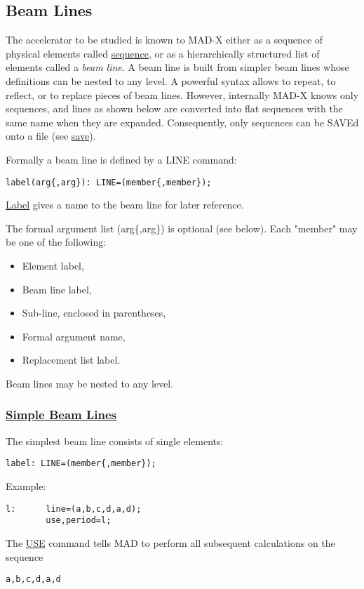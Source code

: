 

\subsection{Beam Lines}

The accelerator to be studied is known to MAD-X either as a sequence of
physical elements called \href{sequence.html}{sequence}, or as a
hierarchically structured list of elements called a \emph{beam line}. A
beam line is built from simpler beam lines whose definitions can be
nested to any level. A powerful syntax allows to repeat, to reflect, or
to replace pieces of beam lines. However, internally MAD-X knows only
sequences, and lines as shown below are converted into flat sequences
with the same name when they are expanded. Consequently, only sequences
can be SAVEd onto a file (see
\href{../control/general.html#save}{save}).  

Formally a beam line is defined by a LINE command: 
\begin{verbatim}
label(arg{,arg}): LINE=(member{,member});
\end{verbatim}
\href{label.html}{Label} gives a name to the beam line for later reference. 

The formal argument list (arg\{,arg\}) is optional (see below). Each
"member" may be one of the following:  
\begin{itemize}
	\item  Element label, 
	\item  Beam line label, 
	\item  Sub-line, enclosed in parentheses, 
	\item  Formal argument name, 
	\item  Replacement list label. 
\end{itemize} 
Beam lines may be nested to any level.  

\subsubsection{\href{simple}{Simple Beam Lines}} 
The simplest beam line consists of single elements: 
\begin{verbatim}
label: LINE=(member{,member});
\end{verbatim} 
Example: 
\begin{verbatim}
l:      line=(a,b,c,d,a,d);
        use,period=l;
\end{verbatim} 
The \href{../control/general.html#use}{USE} command tells MAD to perform
all subsequent calculations on the sequence  
\begin{verbatim}
a,b,c,d,a,d
\end{verbatim}

